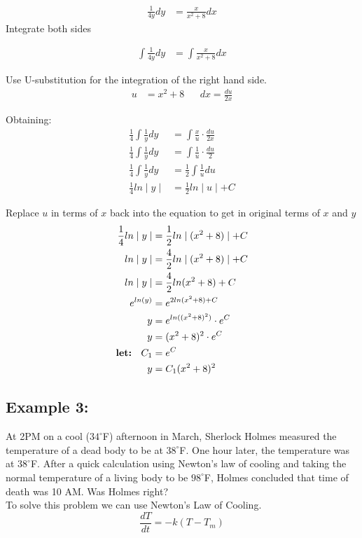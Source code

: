 \documentclass{article}
\begin{document}
\begin{flushleft}
{\begin{align*}
\frac{1}{4y} dy & = \frac{x}{x^2 + 8} dx
\end{align*}
Integrate both sides

\begin{align*}
\int \frac{1}{4y} dy & = \int \frac{x}{x^2 + 8} dx
\end{align*}

Use U-substitution for the integration of the right hand side.
\begin{align*}
u & = x^2 + 8  && dx = \frac{du}{2x}
\end{align*}

Obtaining: \\
\begin{align*}
\frac{1}{4}\int\frac{1}{y}dy & = \int \frac{x}{u} \cdot \frac{du}{2x} \\
\frac{1}{4}\int\frac{1}{y}dy & = \int \frac{1}{u} \cdot \frac{du}{2} \\
\frac{1}{4}\int\frac{1}{y}dy & = \frac{1}{2} \int \frac{1}{u} du \\
\frac{1}{4}ln\mid y \mid & = \frac{1}{2} ln \mid u \mid + C
\end{align*}

Replace $u$ in terms of $x$ back into the equation to get in original terms of $x$ and $y$\\
\begin{align*}
\frac{1}{4}ln\mid y \mid & = \frac{1}{2} ln \mid (x^2 + 8) \mid + C \\
ln\mid y \mid & = \frac{4}{2} ln \mid (x^2 + 8) \mid + C \\
ln\mid y \mid & = \frac{4}{2} ln (x^2 + 8) + C \\
e^{ln(y)} & = e^{2ln(x^2+8) + C} \\
y & = e^{ln((x^2 + 8)^2)}\cdot e^C \\
y & = (x^2 + 8)^2 \cdot e^C \\
\text {\textbf{let: } } C_1 & = e^C \\
y & = C_1(x^2 + 8)^2 
\end{align*}

\subsection*{\textbf{Example 3:}}
At 2PM on a cool ($34^{\circ}$F)  afternoon in March, Sherlock Holmes measured the temperature of a dead body to be at $38^{\circ}$F. One hour later, the temperature was at $38^{\circ}$F. After a quick calculation using Newton’s law of cooling and taking the normal temperature of a living body to be $98^{\circ}$F, Holmes concluded that time of death was 10 AM. Was Holmes right?\\
\bigskip
To solve this problem we can use Newton's Law of Cooling.\\
\[ \frac{dT}{dt} = -k(T-T_m)\]

}
\end{flushleft}
\end{document}
